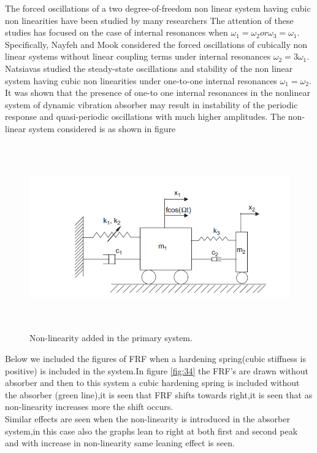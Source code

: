 The forced oscillations of a two degree-of-freedom non linear system having cubic non linearities have been studied by many researchers The attention of these studies has focused on the case of   internal resonances when $\omega_1 = \omega_2 or \omega_3 = \omega_1$. Specifically, Nayfeh and Mook considered the forced oscillations of cubically non linear systems without linear coupling terms under internal resonances $\omega_2=3\omega_1$.  Natsiavas  studied the steady-state oscillations and stability of the non linear system having cubic non linearities under one-to-one internal resonances $\omega_1=\omega_2$. It was shown that the presence of one-to one internal resonances in the nonlinear system of dynamic vibration absorber may result in instability of the periodic response and quasi-periodic oscillations with much higher amplitudes.
The non-linear system considered is as shown in figure
\begin{figure}[h!]
\includegraphics[width=\textwidth,height=8cm]{"figures/non-lineardiag"}
  \caption{Non-linearity added in the primary system.}
  \label{fig:33}
  \end{figure}
  Below we included the figures of FRF when a hardening spring(cubic stiffness is positive) is included in the system.In figure \ref{fig:34} the FRF's are drawn without absorber and then to this system a cubic hardening spring is included without the absorber (green line),it is seen that FRF shifts towards right,it is seen that as non-linearity increases more the shift occurs.\\Similar effects are seen when the non-linearity is introduced in the absorber system,in this case also the graphs lean to right at both first and second peak and with increase in non-linearity same leaning effect is seen.
 
